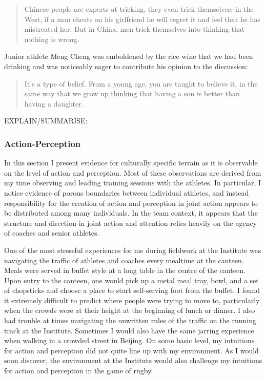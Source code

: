  \begin{quotation}
    Chinese people are experts at tricking, they even trick themselves: in the West, if a man cheats on his girlfriend he will regret it and feel that he has mistreated her.  But in China, men trick themselves into thinking that nothing is wrong.
  \end{quotation}


  Junior athlete Meng Cheng was emboldened by the rice wine that we had been drinking and was noticeably eager to contribute his opinion to the discussion:

  \begin{quotation}
    It's a type of belief. From a young age, you are taught to believe it, in the same way that we grow up thinking that having a son is better than having a daughter.
  \end{quotation}

  EXPLAIN/SUMMARISE:





  \subsubsection{Action-Perception}
  In this section I present evidence for culturally specific terrain as it is observable on the level of action and perception.  Most of these observations are derived from my time observing and leading training sessions with the athletes. In particular, I notice evidence of porous boundaries between individual athletes, and instead responsibility for the creation of action and perception in joint action appears to be distributed among many individuals.  In the team context, it appears that the structure and direction in joint action and attention relies heavily on the agency of coaches and senior athletes.

  One of the most stressful experiences for me during fieldwork at the Institute was navigating the traffic of athletes and coaches every mealtime at the canteen.  Meals were served in buffet style at a long table in the centre of the canteen. Upon entry to the canteen, one would pick up a metal meal tray, bowl, and a set of chopsticks and choose a place to start self-serving foot from the buffet.  I found it extremely difficult to predict where people were trying to move to, particularly when the crowds were at their height at the beginning of lunch or dinner. I also had trouble at times navigating the unwritten rules of the traffic on the running track at the Institute.  Sometimes I would also have the same jarring experience when walking in a crowded street in Beijing. On some basic level, my intuitions for action and perception did not quite line up with my environment.  As I would soon discover, the environment at the Institute would also challenge my intuitions for action and perception in the game of rugby.

